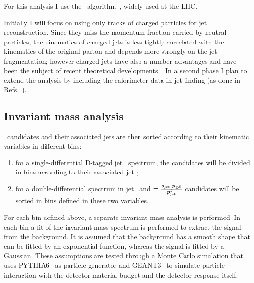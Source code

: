 \documentclass[a4paper]{jpconf}
\begin{document}
For this analysis I use the \antikt\ algorithm~\cite{Cacciari:2008c}, widely used at the LHC.

Initially I will focus on using only tracks of charged particles for jet reconstruction. Since they miss the momentum
fraction carried by neutral particles, the kinematics of charged jets is less tightly correlated with the kinematics
of the original parton and depends more strongly on the jet fragmentation; however charged jets have also a number advantages
and have been the subject of recent theoretical developments~\cite{Thaler:2013}.
In a second phase I plan to extend the analysis by including the calorimeter data in jet finding (as done in Refs.~\cite{ALICE:2013c, ALICE:2015a}).

\subsection{Invariant mass analysis}
\Dzero\ candidates and their associated jets are then sorted according to their kinematic variables in different bins:
\begin{enumerate}
\item for a single-differential D-tagged jet \pT\ spectrum, the candidates will be divided in bins according to their associated jet \pT;
\item for a double-differential spectrum in jet \pT\ and \zpar$=\frac{\bm{p}_{\rm jet}\cdot{\bm{p}}_{\rm D^0}}{\bm{p}_{\rm jet}^2}$ candidates will
be sorted in bins defined in these two variables.
\end{enumerate}
For each bin defined above, a separate invariant mass analysis is performed. 
In each bin a fit of the invariant mass spectrum is performed to extract the signal from the background. It is assumed that the background has
a smooth shape that can be fitted by an exponential function, whereas the signal is fitted by a Gaussian. These assumptions are tested
through a Monte Carlo simulation that uses PYTHIA6~\cite{Sjostrand:2006} as particle generator and GEANT3~\cite{GEANT3-url} to simulate particle interaction
with the detector material budget and the detector response itself.
\end{document}
